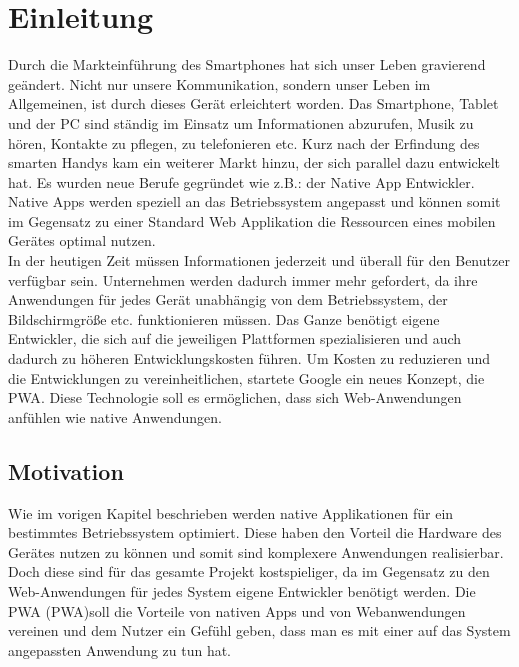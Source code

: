 \chapter{Einleitung}\label{chap:Einleitung}
\thispagestyle{standard}
\pagestyle{standard}
\renewcommand{\footrulewidth}{0.4pt}

Durch die Markteinführung des Smartphones hat sich unser Leben gravierend geändert. 
Nicht nur unsere Kommunikation, sondern unser Leben im Allgemeinen, ist durch dieses Gerät erleichtert worden.
Das Smartphone, Tablet und der PC sind ständig im Einsatz um Informationen abzurufen, Musik zu hören, Kontakte zu pflegen, zu telefonieren etc. Kurz nach der Erfindung des smarten Handys kam ein weiterer Markt 
hinzu, der sich parallel dazu entwickelt hat. Es wurden neue Berufe gegründet wie z.B.: der Native App Entwickler.
Native Apps werden speziell an das Betriebssystem angepasst und können somit im Gegensatz zu einer Standard Web Applikation die Ressourcen eines mobilen Gerätes optimal nutzen.\\ In der heutigen Zeit müssen Informationen jederzeit und überall für den Benutzer verfügbar sein. Unternehmen werden dadurch immer mehr gefordert, da ihre Anwendungen für jedes Gerät unabhängig von dem Betriebssystem, der Bildschirmgröße etc. funktionieren müssen. Das Ganze benötigt eigene Entwickler, die sich auf die jeweiligen Plattformen spezialisieren und auch dadurch zu höheren Entwicklungskosten führen. Um Kosten zu reduzieren und die Entwicklungen zu vereinheitlichen, startete Google ein neues Konzept, die \acl{PWA}. 
Diese Technologie soll es ermöglichen, dass sich Web-Anwendungen anfühlen wie native Anwendungen.   


\section{Motivation} \label{sub:Motivation}
Wie im vorigen Kapitel beschrieben werden native Applikationen für ein bestimmtes Betriebssystem optimiert. Diese haben den Vorteil die Hardware des Gerätes nutzen zu können und somit sind komplexere Anwendungen realisierbar. Doch diese sind für das gesamte Projekt kostspieliger, da im Gegensatz zu den Web-Anwendungen für jedes System eigene Entwickler benötigt werden.
Die \acl{PWA} (\acs{PWA})soll die Vorteile von nativen Apps und von Webanwendungen vereinen und dem Nutzer ein Gefühl geben, dass man es mit einer auf das System angepassten Anwendung zu tun hat.  




